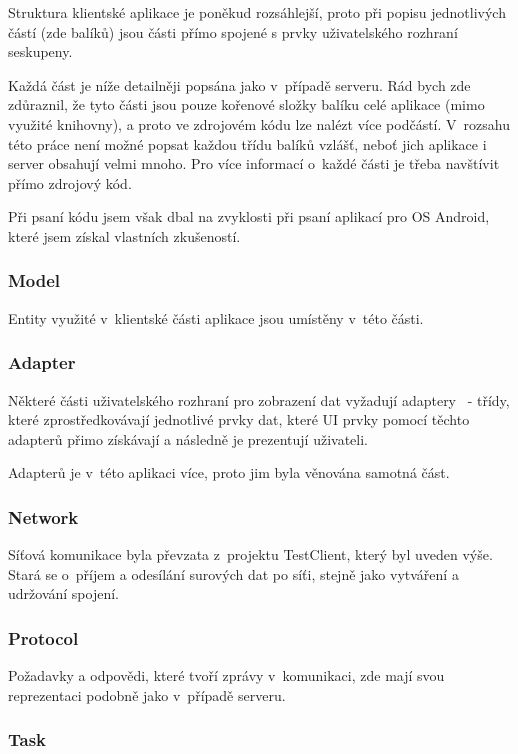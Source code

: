 \documentclass[thesis=B,czech]{FITthesis}[2013/10/20]
\begin{document}
Struktura klientské aplikace je poněkud rozsáhlejší, proto při popisu jednotlivých částí (zde balíků) jsou části přímo spojené s prvky uživatelského rozhraní seskupeny.

Každá část je níže detailněji popsána jako v~případě serveru. Rád bych zde zdůraznil, že tyto části jsou pouze kořenové složky balíku celé aplikace (mimo využité knihovny), a proto ve zdrojovém kódu lze nalézt více podčástí. V~rozsahu této práce není možné popsat každou třídu balíků vzlášť, neboť jich aplikace i server obsahují velmi mnoho. Pro více informací o~každé části je třeba navštívit přímo zdrojový kód.

Při psaní kódu jsem však dbal na zvyklosti při psaní aplikací pro OS Android, které jsem získal vlastních zkušeností.

\subsubsection{Model}

Entity využité v~klientské části aplikace jsou umístěny v~této části.

\subsubsection{Adapter}

Některé části uživatelského rozhraní pro zobrazení dat vyžadují adaptery~\cite{adapter} - třídy, které zprostředkovávají jednotlivé prvky dat, které UI prvky pomocí těchto adapterů přimo získávají a následně je prezentují uživateli. 

Adapterů je v~této aplikaci více, proto jim byla věnována samotná část.

\subsubsection{Network}

Síťová komunikace byla převzata z~projektu TestClient, který byl uveden výše. Stará se o~příjem a odesílání surových dat po síťi, stejně jako vytváření a udržování spojení.

\subsubsection{Protocol}

Požadavky a odpovědi, které tvoří zprávy v~komunikaci, zde mají svou reprezentaci podobně jako v~případě serveru.

\subsubsection{Task}
\end{document}
